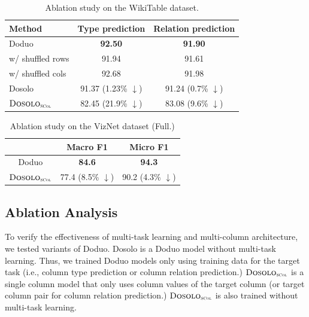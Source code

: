 \documentclass[sigconf]{acmart}
\newcommand{\name}{\mbox{\sc Doduo}}
\newcommand{\namest}{\mbox{\sc Dosolo}}
\newcommand{\namesc}{${\text{\mbox{\sc Dosolo}}}_{\text{\tiny {\sc SCol}}}$}
\newcommand{\rev}[1]{#1}
\begin{document}
\begin{table}[t]
\centering
\footnotesize
\caption{Ablation study on the WikiTable dataset.}\label{tab:ablation_turl}
\vspace{-1em}
\begin{tabular}{l|c|c}\hline
Method & Type prediction & Relation prediction \\\hline\hline
\name    &  {\bf 92.50} & {\bf 91.90} \\
\quad \rev{w/ shuffled rows} & \rev{91.94} & \rev{91.61} \\
\quad \rev{w/ shuffled cols} & \rev{92.68} & \rev{91.98} \\\hline
\namest & 91.37 (1.23\% $\downarrow$) & 91.24 (0.7\% $\downarrow$) \\
\namesc & 82.45 (21.9\% $\downarrow$) & 83.08 (9.6\% $\downarrow$) \\\hline
\end{tabular}
\vspace{-.5em}
\end{table}

\begin{table}[t]
\centering
\footnotesize
\caption{Ablation study on the VizNet dataset (Full.)}\label{tab:ablation_sato}
\vspace{-1em}
\begin{tabular}{c|c|c}\hline
 & Macro F1 & Micro F1  \\\hline\hline
\name    &  {\bf 84.6} & {\bf 94.3} \\
\namesc & 77.4 (8.5\% $\downarrow$) & 90.2 (4.3\% $\downarrow$) \\\hline
\end{tabular}
\vspace{-1em}
\end{table}




\subsection{Ablation Analysis}\label{subsec:ablation}
To verify the effectiveness of multi-task learning and multi-column architecture, we tested variants of \name{}.
%
\namest{} is a \name{} model without multi-task learning. Thus, we trained \name{} models only using training data for the target task (i.e., column type prediction or column relation prediction.)
%
\namesc{} is a single column model that only uses column values of the target column (or target column pair for column relation prediction.) \namesc{} is also trained without multi-task learning.
\end{document}
